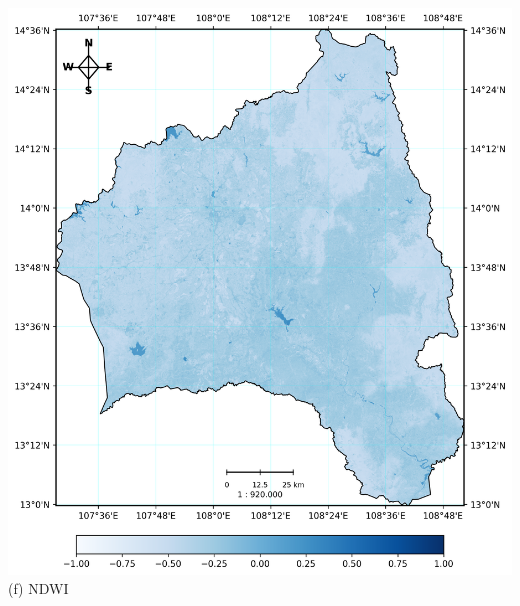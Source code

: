 \documentclass{article}
\begin{document}
\begin{minipage}{0.31\textwidth}
    \includegraphics[width=\textwidth]{NDWI.png}
    \centering (f) NDWI
\end{minipage}

\vspace{0.5em}
\end{document}

